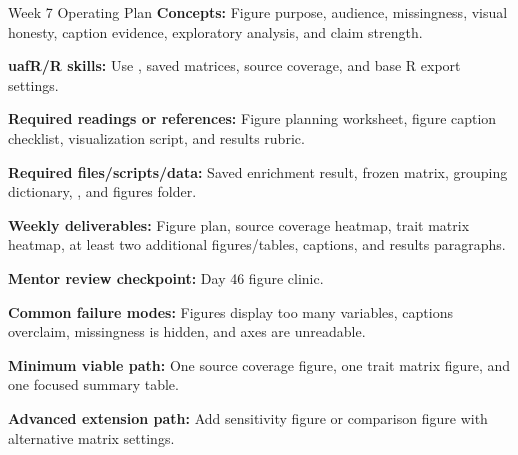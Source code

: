 \begin{checklistbox}{Week 7 Operating Plan}
\textbf{Concepts:} Figure purpose, audience, missingness, visual honesty, caption evidence, exploratory analysis, and claim strength.

\textbf{uafR/R skills:} Use , saved matrices, source coverage, and base R export settings.

\textbf{Required readings or references:} Figure planning worksheet, figure caption checklist, visualization script, and results rubric.

\textbf{Required files/scripts/data:} Saved enrichment result, frozen matrix, grouping dictionary, , and figures folder.

\textbf{Weekly deliverables:} Figure plan, source coverage heatmap, trait matrix heatmap, at least two additional figures/tables, captions, and results paragraphs.

\textbf{Mentor review checkpoint:} Day 46 figure clinic.

\textbf{Common failure modes:} Figures display too many variables, captions overclaim, missingness is hidden, and axes are unreadable.

\textbf{Minimum viable path:} One source coverage figure, one trait matrix figure, and one focused summary table.

\textbf{Advanced extension path:} Add sensitivity figure or comparison figure with alternative matrix settings.
\end{checklistbox}

